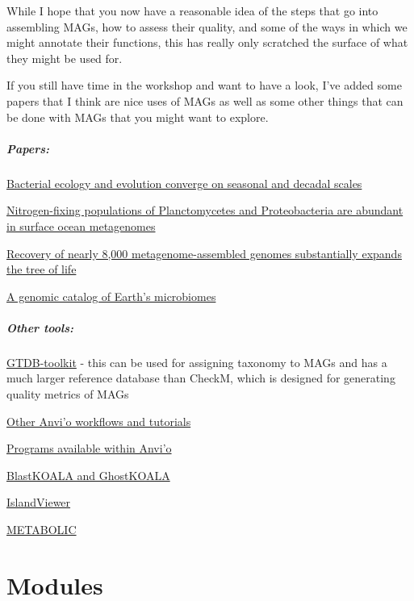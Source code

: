 \documentclass[
]{book}
\begin{document}
While I hope that you now have a reasonable idea of the steps that go into assembling MAGs, how to assess their quality, and some of the ways in which we might annotate their functions, this has really only scratched the surface of what they might be used for.

If you still have time in the workshop and want to have a look, I've added some papers that I think are nice uses of MAGs as well as some other things that can be done with MAGs that you might want to explore.

\subsubsection{Papers:}\label{papers}

\href{https://www.biorxiv.org/content/10.1101/2024.02.06.579087v1}{Bacterial ecology and evolution converge on seasonal and decadal scales}

\href{https://www.nature.com/articles/s41564-018-0176-9}{Nitrogen-fixing populations of Planctomycetes and Proteobacteria are abundant in surface ocean metagenomes}

\href{https://www.nature.com/articles/s41564-017-0012-7}{Recovery of nearly 8,000 metagenome-assembled genomes substantially expands the tree of life}

\href{https://www.nature.com/articles/s41587-020-0718-6}{A genomic catalog of Earth's microbiomes}

\subsubsection{Other tools:}\label{other-tools}

\href{https://github.com/Ecogenomics/GTDBTk}{GTDB-toolkit} - this can be used for assigning taxonomy to MAGs and has a much larger reference database than CheckM, which is designed for generating quality metrics of MAGs

\href{https://anvio.org/learn/}{Other Anvi'o workflows and tutorials}

\href{https://anvio.org/help/main/}{Programs available within Anvi'o}

\href{http://kegg.jp/ghostkoala/}{BlastKOALA and GhostKOALA}

\href{https://www.pathogenomics.sfu.ca/islandviewer}{IslandViewer}

\href{https://microbiomejournal.biomedcentral.com/articles/10.1186/s40168-021-01213-8}{METABOLIC}

\part{Modules}\label{part-modules-2}
\end{document}
